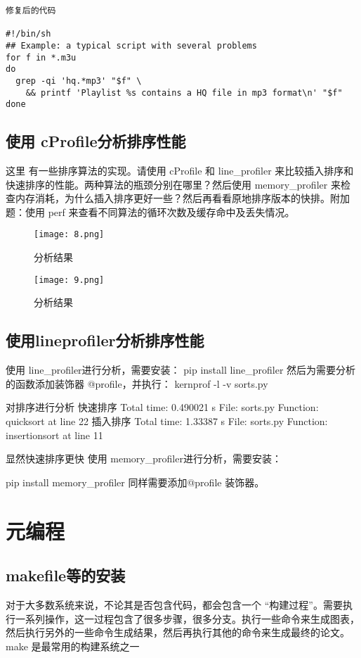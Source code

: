 \documentclass[a4paper, 12pt]{article}
\begin{document}
\begin{lstlisting}
修复后的代码

#!/bin/sh
## Example: a typical script with several problems
for f in *.m3u
do
  grep -qi 'hq.*mp3' "$f" \
    && printf 'Playlist %s contains a HQ file in mp3 format\n' "$f"
done
\end{lstlisting}

\subsection{使用 cProfile分析排序性能} 
这里 有一些排序算法的实现。请使用 cProfile 和 line\_profiler 来比较插入排序和快速排序的性能。两种算法的瓶颈分别在哪里？然后使用 memory\_profiler 来检查内存消耗，为什么插入排序更好一些？然后再看看原地排序版本的快排。附加题：使用 perf 来查看不同算法的循环次数及缓存命中及丢失情况。

\begin{figure}[H]
  \centering
    \texttt{[image: 8.png]}
  \caption{分析结果}
   \end{figure}

   \begin{figure}[H]
  \centering
    \texttt{[image: 9.png]}
  \caption{分析结果}
   \end{figure}
   
\subsection{使用lineprofiler分析排序性能} 
使用 line\_profiler进行分析，需要安装：
 pip install line\_profiler
然后为需要分析的函数添加装饰器 @profile，并执行：
 kernprof -l -v sorts.py

对排序进行分析
快速排序
  Total time: 0.490021 s
 File: sorts.py
 Function: quicksort at line 22
插入排序
  Total time: 1.33387 s
 File: sorts.py
 Function: insertionsort at line 11

 显然快速排序更快
 使用 memory\_profiler进行分析，需要安装：

 pip install memory\_profiler
同样需要添加@profile 装饰器。 


\section{元编程}
 \subsection{makefile等的安装} 
对于大多数系统来说，不论其是否包含代码，都会包含一个 “构建过程”。需要执行一系列操作，这一过程包含了很多步骤，很多分支。执行一些命令来生成图表，然后执行另外的一些命令生成结果，然后再执行其他的命令来生成最终的论文。
make 是最常用的构建系统之一
\end{document}

